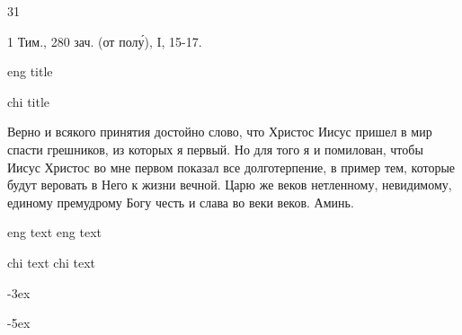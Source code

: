 31

\onehalfspacing %

\doublespacing %

\huge%

1 Тим., 280 зач. (от полу́), I, 15-17.

eng title

chi title

Верно и всякого принятия достойно слово, что Христос Иисус пришел в мир спасти грешников, из которых я первый.
Но для того я и помилован, чтобы Иисус Христос во мне первом показал все долготерпение, в пример тем, которые будут веровать в Него к жизни вечной.
Царю же веков нетленному, невидимому, единому премудрому Богу честь и слава во веки веков. Аминь. 

eng text
eng text

chi text
chi text

\Huge%

-3ex%

-5ex%
